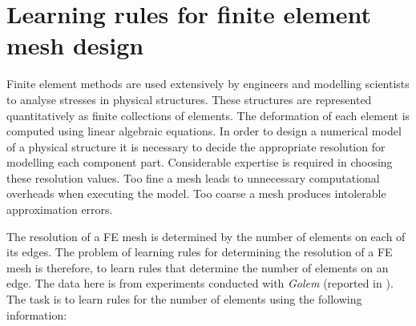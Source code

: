 


\section*{Learning rules for finite element mesh design}
Finite element methods are used extensively by engineers and
modelling scientists to analyse stresses in physical
structures.  These structures are represented quantitatively
as finite collections of elements. The deformation of
each element is computed using linear algebraic
equations. In order to design a numerical
model of a physical structure it is necessary to decide
the appropriate resolution for modelling each
component part. Considerable expertise is
required in choosing these resolution
values. Too fine a mesh leads to unnecessary
computational overheads when executing the model.
Too coarse a mesh produces intolerable approximation errors.

% 

The resolution of a FE mesh is determined by the number of
elements on each of its edges. The problem of learning rules for
determining the resolution of a FE mesh is therefore,
to learn rules that determine the number of
elements on an edge. The data here is from 
experiments conducted with {\em Golem\/} \cite{mugfeng:golem}
(reported in \cite{dolmugg:fem}). The task is to learn
rules for the number of elements using the following
information:

